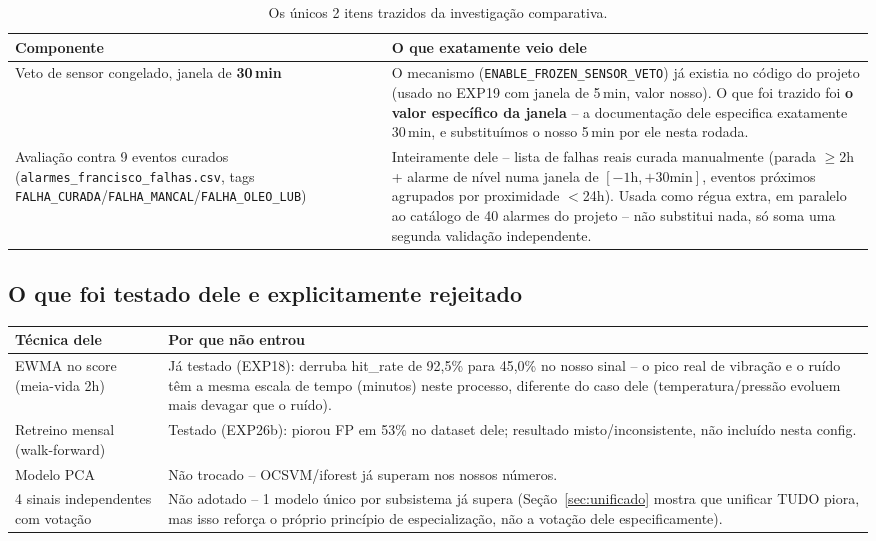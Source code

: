 \documentclass[11pt,a4paper]{article}
\begin{document}
\begin{table}[H]
\centering
\small
\begin{tabular}{p{5cm}p{9.5cm}}
\toprule
\textbf{Componente} & \textbf{O que exatamente veio dele} \\
\midrule
Veto de sensor congelado, janela de \textbf{30\,min} &
O mecanismo (\texttt{ENABLE\_FROZEN\_SENSOR\_VETO}) já existia no
código do projeto (usado no EXP19 com janela de 5\,min, valor nosso).
O que foi trazido foi \textbf{o valor específico da janela} -- a
documentação dele especifica exatamente 30\,min, e substituímos o
nosso 5\,min por ele nesta rodada. \\
Avaliação contra 9 eventos curados (\texttt{alarmes\_francisco\_falhas.csv},
tags \texttt{FALHA\_CURADA}/\texttt{FALHA\_MANCAL}/\texttt{FALHA\_OLEO\_LUB}) &
Inteiramente dele -- lista de falhas reais curada manualmente (parada
$\geq$2h + alarme de nível numa janela de $[-1\text{h}, +30\text{min}]$,
eventos próximos agrupados por proximidade $<$24h). Usada como régua
extra, em paralelo ao catálogo de 40 alarmes do projeto -- não
substitui nada, só soma uma segunda validação independente. \\
\bottomrule
\end{tabular}
\caption{Os únicos 2 itens trazidos da investigação comparativa.}
\end{table}

\subsection{O que foi testado dele e explicitamente rejeitado}

\begin{table}[H]
\centering
\small
\begin{tabular}{p{4.5cm}p{10cm}}
\toprule
\textbf{Técnica dele} & \textbf{Por que não entrou} \\
\midrule
EWMA no score (meia-vida 2h) & Já testado (EXP18): derruba hit\_rate
de 92,5\% para 45,0\% no nosso sinal -- o pico real de vibração e o
ruído têm a mesma escala de tempo (minutos) neste processo, diferente
do caso dele (temperatura/pressão evoluem mais devagar que o ruído). \\
Retreino mensal (walk-forward) & Testado (EXP26b): piorou FP em 53\%
no dataset dele; resultado misto/inconsistente, não incluído nesta
config. \\
Modelo PCA & Não trocado -- OCSVM/iforest já superam nos nossos
números. \\
4 sinais independentes com votação & Não adotado -- 1 modelo único
por subsistema já supera (Seção~\ref{sec:unificado} mostra que
unificar TUDO piora, mas isso reforça o próprio princípio de
especialização, não a votação dele especificamente). \\
\bottomrule
\end{tabular}
\end{table}
\end{document}
